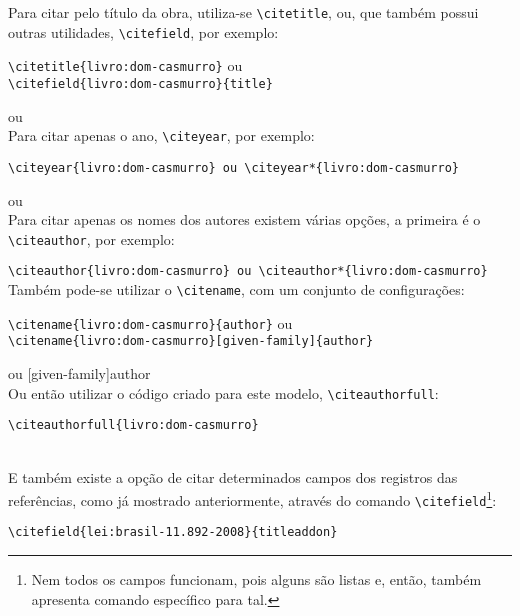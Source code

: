 Para citar pelo título da obra, utiliza-se \verb|\citetitle|, ou, que também possui outras utilidades, \verb|\citefield|, por exemplo: 

\verb|\citetitle{livro:dom-casmurro}| ou \\\verb|\citefield{livro:dom-casmurro}{title}|

 ou \\

Para citar apenas o ano, \verb|\citeyear|, por exemplo: 

\verb|\citeyear{livro:dom-casmurro} ou \citeyear*{livro:dom-casmurro}|

\citeyear{livro:dom-casmurro} ou \citeyear*{livro:dom-casmurro}\\

Para citar apenas os nomes dos autores existem várias opções, a primeira é o \verb|\citeauthor|, por exemplo: 

\verb|\citeauthor{livro:dom-casmurro} ou \citeauthor*{livro:dom-casmurro}|\\

Também pode-se utilizar o \verb|\citename|, com um conjunto de configurações: 

\verb|\citename{livro:dom-casmurro}{author}| ou \\\verb|\citename{livro:dom-casmurro}[given-family]{author}|

 ou [given-family]{author}\\

Ou então utilizar o código criado para este modelo, \verb|\citeauthorfull|\footnotemark:

\verb|\citeauthorfull{livro:dom-casmurro}|

\\

E também existe a opção de citar determinados campos dos registros das referências, como já mostrado anteriormente, através do comando \verb|\citefield|\footnote{Nem todos os campos funcionam, pois alguns são listas e, então, também apresenta comando específico para tal.}:

\verb|\citefield{lei:brasil-11.892-2008}{titleaddon}|


